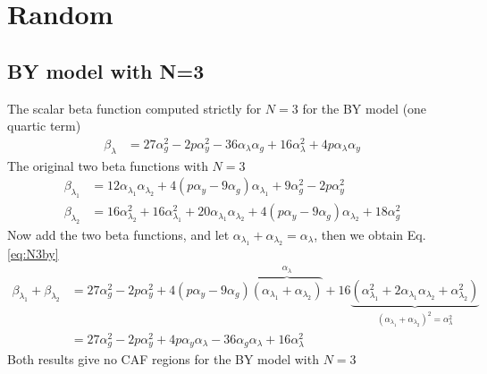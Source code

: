 
\section{Random}
\subsection{BY model with N=3}
The scalar beta function computed strictly for $N=3$ for the BY model (one quartic term)
\begin{align}
    \beta_\lambda &= 27\alpha_g^2 - 2p\alpha_y^2 - 36\alpha_\lambda\alpha_g + 16\alpha_\lambda^2 + 4p\alpha_\lambda\alpha_y \label{eq:N3by}
\end{align}
The original two beta functions with $N=3$
\begin{align}
\beta_{\lambda_1} &= 12\alpha_{\lambda_1}\alpha_{\lambda_2} + 4(p\alpha_y - 9\alpha_g)\alpha_{\lambda_1} + 9\alpha_g^2 - 2p\alpha_y^2 \\
\beta_{\lambda_2} &= 16\alpha_{\lambda_2}^2 + 16\alpha_{\lambda_1}^2 + 20\alpha_{\lambda_1}\alpha_{\lambda_2} + 4(p\alpha_y - 9\alpha_g)\alpha_{\lambda_2} + 18\alpha_g^2 
\end{align}
Now add the two beta functions, and let $\alpha_{\lambda_1}+\alpha_{\lambda_2}=\alpha_{\lambda}$, then we obtain Eq. \eqref{eq:N3by}
\begin{align}
    \beta_{\lambda_1} + \beta_{\lambda_2} &= 27\alpha_g^2 - 2p\alpha_y^2  +4(p\alpha_y - 9\alpha_g)\overbrace{(\alpha_{\lambda_1} + \alpha_{\lambda_2})}^{\alpha_\lambda}  + 16\underbrace{(\alpha_{\lambda_1}^2 + 2\alpha_{\lambda_1}\alpha_{\lambda_2} + \alpha_{\lambda_2}^2)}_{(\alpha_{\lambda_1} + \alpha_{\lambda_2})^2=\alpha_\lambda^2} \\
    &= 27\alpha_g^2 - 2p\alpha_y^2 + 4p\alpha_y\alpha_\lambda - 36\alpha_g\alpha_\lambda + 16\alpha_\lambda^2
\end{align}
Both results give no CAF regions for the BY model with $N=3$


